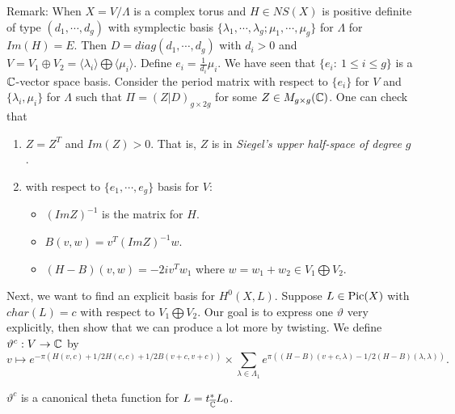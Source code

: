Remark: When $X=V/\Lambda$ is a complex torus and $H\in NS(X)$ is positive definite of type $(d_1,\cdots,d_g)$ with symplectic basis $\{\lambda_1,\cdots,\lambda_g;\mu_1,\cdots,\mu_g\}$ for $\Lambda$ for $Im(H)=E$. Then $D=diag(d_1,\cdots, d_g)$ with $d_i>0$ and $V=V_1\oplus V_2=\langle \lambda_i\rangle\bigoplus \langle \mu_i\rangle$. Define $e_i=\frac{1}{d_i}\mu_i$. We have seen that $\{e_i:\ 1\leq i \leq g\}$ is a ${\mathbb C}$-vector space basis. Consider the period matrix with respect to $\{e_i\}$ for $V$ and $\{\lambda_i,\mu_i\}$ for $\Lambda$ such that $\Pi = (Z|D)_{g\times 2g}$ for some $Z\in M_{g\times g}({\mathbb C})$. One can check that 
\begin{enumerate}
\item $Z=Z^T$ and $Im(Z)>0$. That is, $Z$ is in {\em Siegel's upper half-space of degree} $g$. 
\item with respect to $\{e_1,\cdots,e_g\}$ basis for $V$:
\begin{itemize}
\item  $(Im Z)^{-1}$ is the matrix for $H$.
\item  $B(v,w)=v^T(Im Z)^{-1}w$.
\item $(H-B)(v,w)=-2iv^Tw_1$ where $w=w_1+w_2\in V_1\bigoplus V_2$.
\end{itemize} 
\end{enumerate}

Next, we want to find an explicit basis for $H^0(X,L)$. Suppose $L\in \operatorname{Pic}(X)$ with $char(L)=c$ with respect to $V_1\bigoplus V_2$. Our goal is to express one $\vartheta$ very explicitly, then show that we can produce a lot more by twisting. We define $\vartheta^c:V\to {\mathbb C}$ by 
$$v\mapsto e^{-\pi(H(v,c)+1/2H(c,c)+1/2 B(v+c,v+c))}\times \sum_{\lambda\in \Lambda_1} e^{\pi((H-B)(v+c,\lambda)-1/2(H-B)(\lambda,\lambda))}.$$

\begin{theorem}
$\vartheta^c$ is a canonical theta function for $L=t_{\overline{{\mathbb C}}}^* L_0$. 
\end{theorem}

